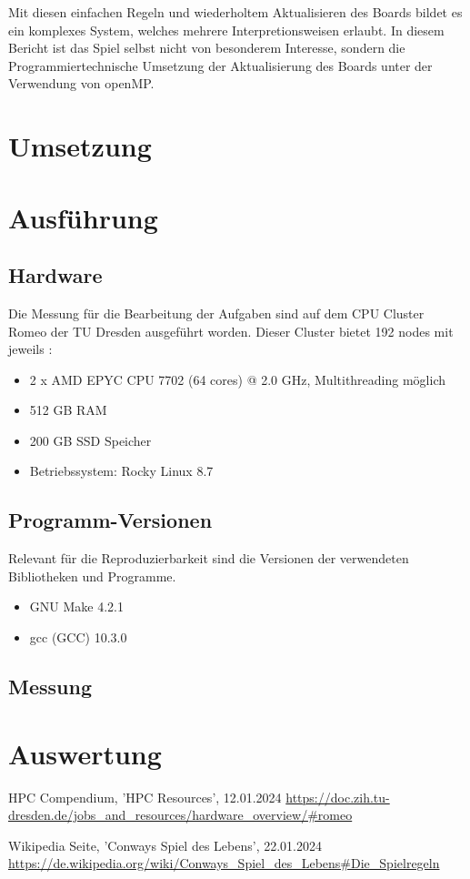 \documentclass[plainarticle,zihtitle,german,final,hyperref,utf8]{zihpub}
\begin{document}
 
 Mit diesen einfachen Regeln und wiederholtem Aktualisieren des Boards bildet es ein komplexes System, welches mehrere Interpretionsweisen erlaubt.\cite{conwaysgame_wiki}\newline
 In diesem Bericht ist das Spiel selbst nicht von besonderem Interesse, sondern die Programmiertechnische Umsetzung der Aktualisierung des Boards unter der Verwendung von openMP.
 
\section{Umsetzung}
\section{Ausführung}
\subsection{Hardware}
Die Messung für die Bearbeitung der Aufgaben sind auf dem CPU Cluster Romeo der TU Dresden ausgeführt worden. Dieser Cluster bietet 192 nodes mit jeweils \cite{hpc_compendium}:
\begin{itemize}
	\item 2 x AMD EPYC CPU 7702 (64 cores) @ 2.0 GHz, Multithreading möglich
	\item 512 GB RAM
	\item 200 GB SSD Speicher
	\item Betriebssystem: Rocky Linux 8.7
\end{itemize}

\subsection{Programm-Versionen}
Relevant für die Reproduzierbarkeit sind die Versionen der verwendeten Bibliotheken und Programme.
\begin{itemize}
	\item GNU Make 4.2.1
	\item gcc (GCC) 10.3.0
\end{itemize}

\subsection{Messung}

\section{Auswertung}


\newpage
\begin{thebibliography}{9}
	HPC Compendium, 'HPC Resources', 12.01.2024\newline
	\url{https://doc.zih.tu-dresden.de/jobs_and_resources/hardware_overview/#romeo}
	
	Wikipedia Seite, 'Conways Spiel des Lebens', 22.01.2024\newline
	\url{https://de.wikipedia.org/wiki/Conways_Spiel_des_Lebens#Die_Spielregeln}
\end{thebibliography}
\end{document}
